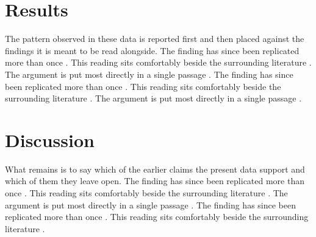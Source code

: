 \documentclass{article}
\begin{document}
\section{Results}
The pattern observed in these data is reported first and then placed against the findings it is meant to be read alongside. The finding has since been replicated more than once \parencite{bowlby1969attachment,piaget1952origins}. This reading sits comfortably beside the surrounding literature \parencite{vygotsky1978mind}. The argument is put most directly in a single passage \parencite[p.~14]{sherif1936psychology}. The finding has since been replicated more than once \parencite{bem1972selfperception,schwartz1992universals}. This reading sits comfortably beside the surrounding literature \parencite{durkheim1951suicide}. The argument is put most directly in a single passage \parencite[p.~14]{weber1930protestant}.

\section{Discussion}
What remains is to say which of the earlier claims the present data support and which of them they leave open. The finding has since been replicated more than once \parencite{becker1968crime,thalersunstein2008nudge}. This reading sits comfortably beside the surrounding literature \parencite{ariely2008predictably}. The argument is put most directly in a single passage \parencite[p.~14]{diener1984subjective}. The finding has since been replicated more than once \parencite{ross1977intuitive,tajfelturner1979integrative}. This reading sits comfortably beside the surrounding literature \parencite{markuskitayama1991culture}.

\printbibliography
\end{document}
